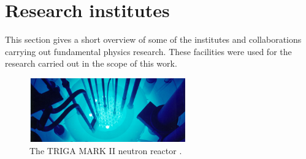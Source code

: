 \section{Research institutes}
This section gives a short overview of some of the institutes and collaborations carrying out fundamental physics research. These facilities were used for the research carried out in the scope of this work. 

\begin{figure}[!t]
\centering
\includegraphics[width=0.6\textwidth]{01_introduction/pics/triga}
\caption{The TRIGA MARK II neutron reactor \cite{GeneralAtomics}.}
\label{fig:triga}
\end{figure}

